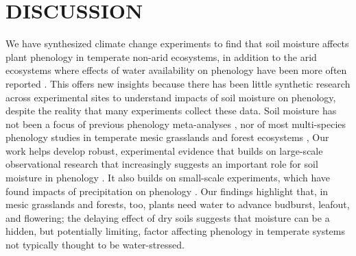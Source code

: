 \documentclass{article}
\begin{document}
\section* {DISCUSSION}
\par We have synthesized climate change experiments to find that soil moisture affects plant phenology in temperate non-arid ecosystems, in addition to the arid ecosystems where effects of water availability on phenology have been more often reported \cite[e.g.,][]{reich1984,van1993,cleverly2016soil,bertiller1991seasonal}. This offers new insights because there has been little synthetic research across experimental sites to understand impacts of soil moisture on phenology, despite the reality that many experiments collect these data. Soil moisture has not been a focus of previous phenology meta-analyses \cite[e.g.,][]{wolkovich2012}, nor of most multi-species phenology studies in temperate mesic grasslands and forest ecosystems \cite[e.g.,][]{Vitass2021}, Our work helps develop robust, experimental evidence that builds on large-scale observational research that increasingly suggests an important role for soil moisture in phenology \cite[e.g.,][]{}. It also builds on small-scale experiments, which have found impacts of precipitation on phenology \cite[e.g.,][]{currier2022precipitation}. Our findings highlight that, in mesic grasslands and forests, too, plants need water to advance budburst, leafout, and flowering; the delaying effect of dry soils suggests that moisture can be a hidden, but potentially limiting, factor affecting phenology in temperate systems not typically thought to be water-stressed. 
\end{document}
